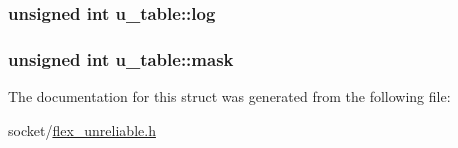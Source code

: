 \subsubsection[{\texorpdfstring{log}{log}}]{\setlength{\rightskip}{0pt plus 5cm}unsigned int u\+\_\+table\+::log}\hypertarget{structu__table_ab9c33f2ba15bf3544b0176fbe59ccecd}{}\label{structu__table_ab9c33f2ba15bf3544b0176fbe59ccecd}
\subsubsection[{\texorpdfstring{mask}{mask}}]{\setlength{\rightskip}{0pt plus 5cm}unsigned int u\+\_\+table\+::mask}\hypertarget{structu__table_aeb1108e804777cac0e332f0310a78f09}{}\label{structu__table_aeb1108e804777cac0e332f0310a78f09}


The documentation for this struct was generated from the following file\+:\begin{DoxyCompactItemize}
\item 
socket/\hyperlink{flex__unreliable_8h}{flex\+\_\+unreliable.\+h}\end{DoxyCompactItemize}
